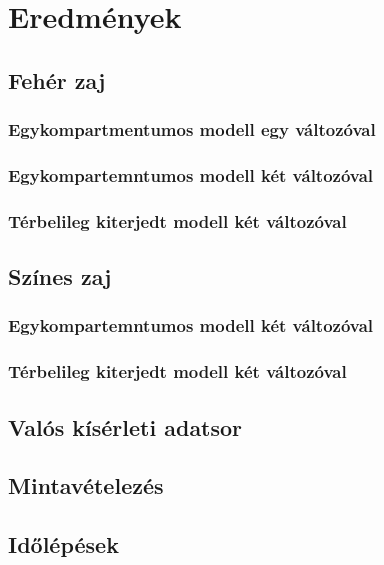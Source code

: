 \section{Eredmények}

\subsection{Fehér zaj}

\subsubsection{Egykompartmentumos modell egy változóval}

\subsubsection{Egykompartemntumos modell két változóval}

\subsubsection{Térbelileg kiterjedt modell két változóval}



\subsection{Színes zaj}

\subsubsection{Egykompartemntumos modell két változóval}

\subsubsection{Térbelileg kiterjedt modell két változóval}

\subsection{Valós kísérleti adatsor}

\subsection{Mintavételezés}

\subsection{Időlépések}